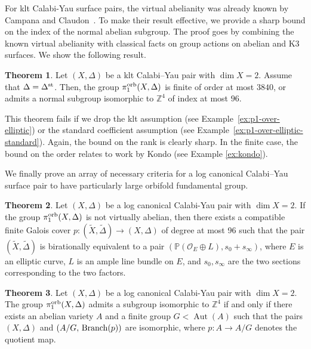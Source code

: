 \documentclass{amsart}
\newcommand{\Aut}{\operatorname{Aut}}
\newcommand{\zz}{\mathbb{Z}}
\theoremstyle{definition}
\newtheorem{alphtheorem}{Theorem}
\theoremstyle{remark}
\numberwithin{equation}{section}
\begin{document}
For klt Calabi-Yau surface pairs, the virtual abelianity was already known by Campana and Claudon~\cite{CC14}. To make their result effective, we provide a sharp bound on the index of the normal abelian subgroup. The proof goes by combining the known virtual abelianity with classical facts on group actions on abelian and K3 surfaces. We show the following result.

\begin{alphtheorem}\label{introthm:fun-group-klt}
Let $(X,\Delta)$ be a klt Calabi--Yau pair with $\dim X =2$. Assume that $\Delta =\Delta^{\rm st}$.
Then, the group $\pi_1^{\rm orb}(X,\Delta)$ 
is finite of order at most $3840$, or admits a normal subgroup isomorphic to $\zz^4$ of index at most $96$.
\end{alphtheorem} 

This theorem fails if we drop the klt assumption (see Example~\ref{ex:p1-over-elliptic}) or the standard coefficient assumption (see Example~\ref{ex:p1-over-elliptic-standard}). Again, the bound on the rank is clearly sharp. In the finite case, the bound on the order relates to work by Kondo (see Example \ref{ex:kondo}).


We finally prove an array of necessary criteria for a log canonical Calabi--Yau surface pair to have particularly large orbifold fundamental group.

\begin{alphtheorem}\label{introthm:fun-group-not-virt-ab}
Let $(X,\Delta)$ be a log canonical Calabi-Yau pair with $\dim X = 2$. If the group $\pi_1^{\rm orb}(X,\Delta)$ is not virtually abelian, then there exists a compatible finite Galois cover $p: (\tilde{X},\tilde{\Delta})\to (X,\Delta)$ of degree at most 96 such that the pair $(\tilde{X},\tilde{\Delta})$ is birationally equivalent to a pair $(\mathbb{P}(\mathcal{O}_E\oplus L),s_0+s_{\infty})$, where $E$ is an elliptic curve, $L$ is an ample line bundle on $E$, and $s_0,s_{\infty}$ are the two sections corresponding to the two factors.
\end{alphtheorem}


\begin{alphtheorem}\label{introthm:fun-group-Z4}
Let $(X,\Delta)$ be a log canonical Calabi-Yau pair with $\dim X = 2$. The group $\pi_1^{\rm orb}(X,\Delta)$ admits a subgroup isomorphic to $\mathbb{Z}^4$ {if and only if} there exists an abelian variety $A$ and a finite group $G<\Aut(A)$ such that the pairs $(X,\Delta)$ and $(A/G,\,{\rm Branch}(p))$ are isomorphic, where $p:A\to A/G$ denotes the quotient map.
\end{alphtheorem}
\end{document}
